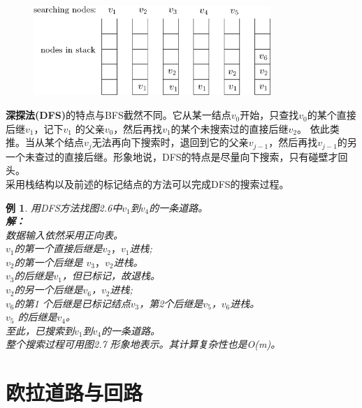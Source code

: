 \documentclass[11pt,a4paper,openany]{book}
\newtheorem{sample}{\textbf{例}}[section]
\begin{document}
\begin{figure}[h]
  \centering
  \vspace{-10pt}
  \includegraphics[width=0.8\textwidth]{2.6DFS.png}
  \caption{}\label{fig:2.7}\vspace{-10pt}
\end{figure}
\indent \textbf{深探法(DFS)}的特点与BFS截然不同。它从某一结点$v_0$开始，只查找$v_0$的某个直接后继$v_1$，记下$v_1$ 的父亲$v_0$，然后再找$v_1$的某个未搜索过的直接后继$v_2$。 依此类推。当从某个结点$v_j$无法再向下搜索时，退回到它的父亲$v_{j-1}$，然后再找$v_{j-1}$的另一个未查过的直接后继。形象地说，DFS的特点是尽量向下搜索，只有碰壁才回头。\\
\indent 采用栈结构以及前述的标记结点的方法可以完成DFS的搜索过程。\\
\begin{sample}\K
用DFS方法找图2.6中$v_1$到$v_4$的一条道路。\\
 \textbf{解：}\\
 数据输入依然采用正向表。\\
 $v_1$的第一个直接后继是$v_2，v_1$进栈;\\
 $v_2$的第一个后继是 $v_3，v_2$进栈。\\
 $v_3$的后继是$v_1$，但已标记，故退栈。\\
 $v_2$的另一个后继是$v_6$，$v_2$进栈;\\
 $v_6$的第1 个后继是已标记结点$v_3$，第2个后继是$v_5$，$v_6$进栈。\\
 $v_5$ 的后继是$v_4$。\\
 至此，已搜索到$v_1$到$v_4$的一条道路。\\
 整个搜索过程可用图2.7 形象地表示。其计算复杂性也是O(m)。
\end{sample}
\section{欧拉道路与回路}
\end{document}
